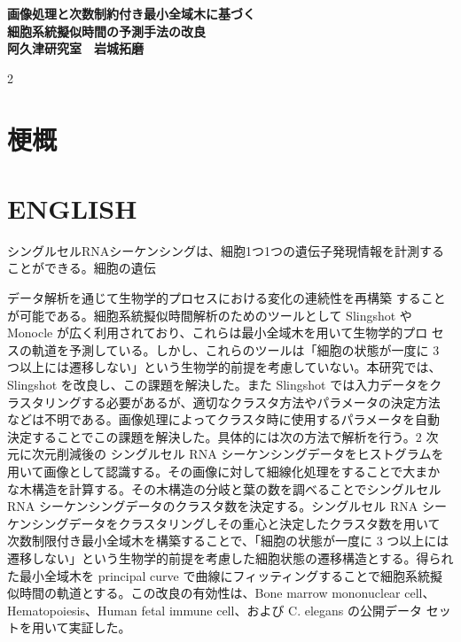 \documentclass{article}
\begin{document}
\begin{center}
{\fontsize{80}{90}\selectfont \bfseries 画像処理と次数制約付き最小全域木に基づく}\\
\vspace{1cm}
{\fontsize{80}{90}\selectfont \bfseries 細胞系統擬似時間の予測手法の改良}\\
\vspace{1cm}
{\fontsize{50}{50}\selectfont \bfseries 阿久津研究室　岩城拓磨}
\end{center}

\vspace{1cm}
\begin{multicols}{2}
\section*{\fontsize{60}{0}\selectfont 梗概}
\section*{\fontsize{60}{0}\selectfont ENGLISH}

\begin{minipage}{\columnwidth}
\vspace{1cm}
\baselineskip=43pt 
{\fontsize{35}{100}\selectfont シングルセルRNAシーケンシングは、細胞1つ1つの遺伝子発現情報を計測することができる。細胞の遺伝


データ解析を通じて生物学的プロセスにおける変化の連続性を再構築 することが可能である。細胞系統擬似時間解析のためのツールとして Slingshot や Monocle が広く利用されており、これらは最小全域木を用いて生物学的プロ セスの軌道を予測している。しかし、これらのツールは「細胞の状態が一度に 3 つ以上には遷移しない」という生物学的前提を考慮していない。本研究では、 Slingshot を改良し、この課題を解決した。また Slingshot では入力データをク ラスタリングする必要があるが、適切なクラスタ方法やパラメータの決定方法 などは不明である。画像処理によってクラスタ時に使用するパラメータを自動 決定することでこの課題を解決した。具体的には次の方法で解析を行う。2 次 元に次元削減後の シングルセル RNA シーケンシングデータをヒストグラムを 用いて画像として認識する。その画像に対して細線化処理をすることで大まか な木構造を計算する。その木構造の分岐と葉の数を調べることでシングルセル RNA シーケンシングデータのクラスタ数を決定する。シングルセル RNA シー ケンシングデータをクラスタリングしその重心と決定したクラスタ数を用いて 次数制限付き最小全域木を構築することで、「細胞の状態が一度に 3 つ以上には 遷移しない」という生物学的前提を考慮した細胞状態の遷移構造とする。得られ た最小全域木を principal curve で曲線にフィッティングすることで細胞系統擬 似時間の軌道とする。この改良の有効性は、Bone marrow mononuclear cell、 Hematopoiesis、Human fetal immune cell、および C. elegans の公開データ セットを用いて実証した。}
\end{minipage}
\vspace{1cm}

\end{multicols}
\end{document}

